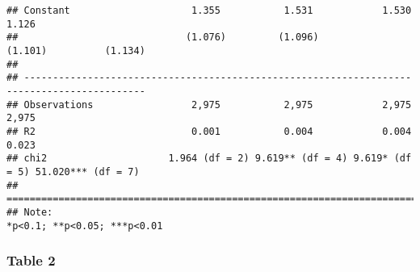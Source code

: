 \documentclass[
]{article}
\begin{document}
\begin{verbatim}
## Constant                     1.355           1.531            1.530            1.126       
##                             (1.076)         (1.096)          (1.101)          (1.134)      
##                                                                                            
## -------------------------------------------------------------------------------------------
## Observations                 2,975           2,975            2,975            2,975       
## R2                           0.001           0.004            0.004            0.023       
## chi2                     1.964 (df = 2) 9.619** (df = 4) 9.619* (df = 5) 51.020*** (df = 7)
## ===========================================================================================
## Note:                                                           *p<0.1; **p<0.05; ***p<0.01
\end{verbatim}

\hypertarget{table-2-1}{%
\subsubsection{Table 2}\label{table-2-1}}
\end{document}
